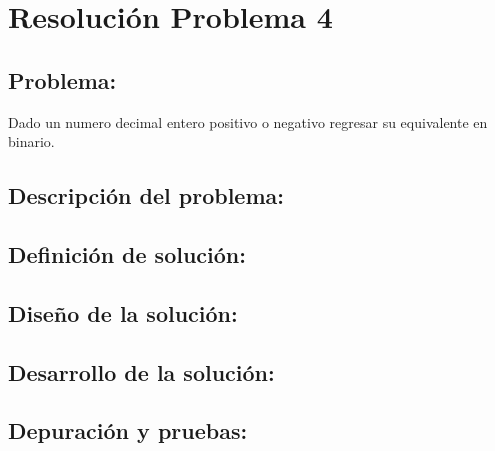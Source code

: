 \section{Resolución Problema 4}
\subsection{Problema:}
Dado un numero decimal entero positivo o negativo regresar su equivalente en binario.


\subsection{\textbf{Descripción del problema:}}

\subsection{\textbf{Definición de solución:}}

\subsection{\textbf{Diseño de la solución:}}

\subsection{\textbf{Desarrollo de la solución:}}

\subsection{\textbf{Depuración y pruebas:}}